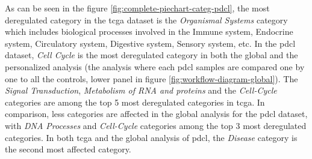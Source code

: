 As can be seen in the figure \ref*{fig:complete-piechart-categ-pdcl}, the most deregulated category in the \acrshort{tcga} dataset is the \textit{Organismal Systems} category which includes biological processes involved in the Immune system, Endocrine system, Circulatory system, Digestive system, Sensory system, etc.
In the \acrshort{pdcl} dataset, \textit{Cell Cycle} is the most deregulated category in both the global and the personalized analysis (the analysis where each \acrshort{pdcl} samples are compared one by one to all the controls, lower panel in figure \ref*{fig:workflow-diagram-global}).
The \textit{Signal Transduction}, \textit{Metabolism of RNA and proteins} and the \textit{Cell-Cycle} categories are among the top 5 most deregulated categories in \acrshort{tcga}.
In comparison, less categories are affected in the global analysis for the \acrshort{pdcl} dataset, with \textit{DNA Processes} and \textit{Cell-Cycle} categories among the top 3 most deregulated categories.
In both \acrshort{tcga} and the global analysis of \acrshort{pdcl}, the \textit{Disease} category is the second most affected category.
